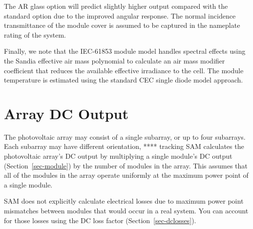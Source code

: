 \documentclass[12pt,letterpaper]{article}
\begin{document}
The AR glass option will predict slightly higher output compared with the standard option due to the improved angular response.  The normal incidence transmittance of the module cover is assumed to be captured in the nameplate rating of the system. 

Finally, we note that the IEC-61853 module model handles spectral effects using the Sandia effective air mass polynomial to calculate an air mass modifier coefficient that reduces the available effective irradiance to the cell. The module temperature is estimated using the standard CEC single diode model approach.


\chapter{Array DC Output}\label{sec-arraydcoutput}

The photovoltaic array may consist of a single subarray, or up to four subarrays. Each subarray may have different orientation, **** tracking  SAM calculates the photovoltaic array's DC output by multiplying a single module's DC output (Section~\ref{sec-module}) by the number of modules in the array. This assumes that all of the modules in the array operate uniformly at the maximum power point of a single module. 

SAM does not explicitly calculate electrical losses due to maximum power point mismatches between modules that would occur in a real system. You can account for those losses using the DC loss factor (Section~\ref{sec-dclosses}).
\end{document}
